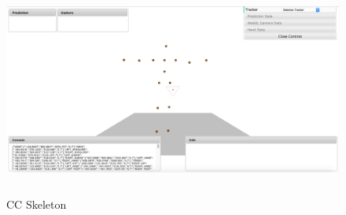 \begin{figure}
	[h] \centering 
	\includegraphics[height=7cm]{figures/content/cc-skeleton.jpg} 
	\caption{CC Skeleton} 
	\label{fg:cc:skeleton} 
\end{figure}
